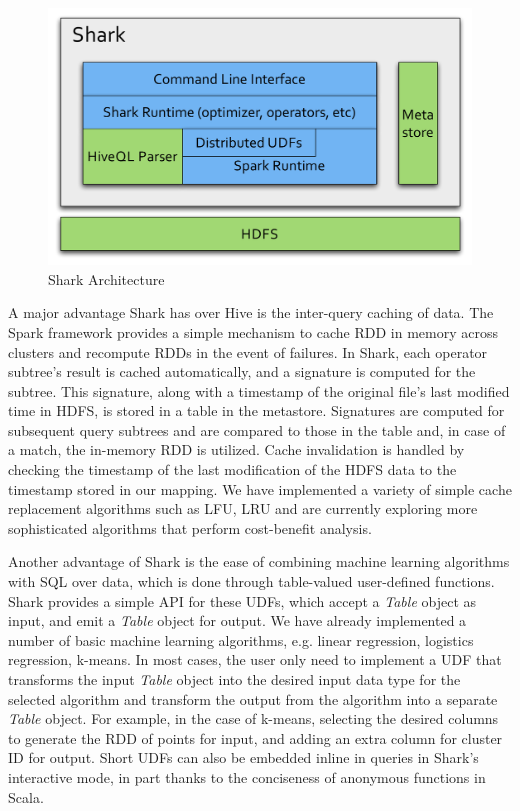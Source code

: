 \documentclass[preprint]{acm_proc_article-sp}
\begin{document}
\begin{figure}[h*]
	\centering
	\includegraphics[width=\linewidth]{files/architecture.pdf}
	\caption{Shark Architecture}
	\label{fig:arch}
\end{figure}

A major advantage Shark has over Hive is the inter-query caching of data. The Spark framework provides a simple mechanism to cache RDD in memory across clusters and recompute RDDs in the event of failures. In Shark, each operator subtree's result is cached automatically, and a signature is computed for the subtree. This signature, along with a timestamp of the original file's last modified time in HDFS, is stored in a table in the metastore. Signatures are computed for subsequent query subtrees and are compared to those in the table and, in case of a match, the in-memory RDD is utilized. Cache invalidation is handled by checking the timestamp of the last modification of the HDFS data to the timestamp stored in our mapping. We have implemented a variety of simple cache replacement algorithms such as LFU, LRU and are currently exploring more sophisticated algorithms that perform cost-benefit analysis.

Another advantage of Shark is the ease of combining machine learning algorithms with SQL over data, which is done through table-valued user-defined functions. Shark provides a simple API for these UDFs, which accept a \emph{Table} object as input, and emit a \emph{Table} object for output. We have already implemented a number of basic machine learning algorithms, e.g. linear regression, logistics regression, k-means. In most cases, the user only need to implement a UDF that transforms the input \emph{Table} object into the desired input data type for the selected algorithm and transform the output from the algorithm into a separate \emph{Table} object. For example, in the case of k-means, selecting the desired columns to generate the RDD of points for input, and adding an extra column for cluster ID for output. Short UDFs can also be embedded inline in queries in Shark's interactive mode, in part thanks to the conciseness of anonymous functions in Scala.
\end{document}
